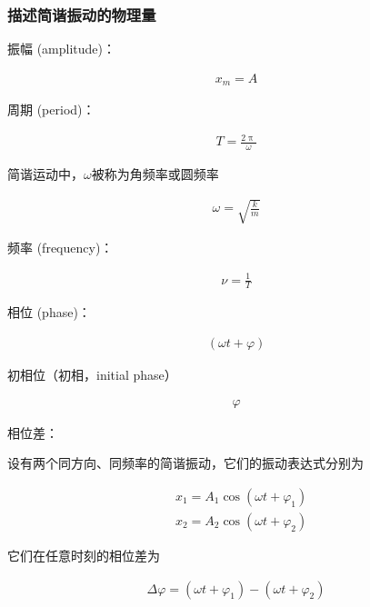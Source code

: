 \documentclass[12pt, a4paper]{article}
\numberwithin{equation}{section}
\begin{document}
\subsubsection{描述简谐振动的物理量}

    振幅 (amplitude)：

    \begin{align}
        x_m = A
    \end{align}

    周期 (period)：

    \begin{align}
        T = \frac{2 \uppi}{\omega}
    \end{align}

    简谐运动中，\(\omega\)被称为角频率或圆频率

    \begin{align}
        \omega = \sqrt{\frac{k}{m}}
    \end{align}

    频率 (frequency)：

    \begin{align}
        \nu = \frac{1}{T}
    \end{align}

    相位 (phase)：

    \begin{align}
        \left(\omega t + \varphi\right)
    \end{align}

    初相位（初相，initial phase）

    \begin{align}
        \varphi
    \end{align}

    相位差：

    设有两个同方向、同频率的简谐振动，它们的振动表达式分别为
    
    $$
        \begin{aligned}
            & x_1=A_1 \cos \left(\omega t+\varphi_1\right) \\
            & x_2=A_2 \cos \left(\omega t+\varphi_2\right)
        \end{aligned}
    $$

    它们在任意时刻的相位差为

    \begin{align}
        \Delta \varphi = \left(\omega t+\varphi_1\right) - \left(\omega t+\varphi_2\right)
    \end{align}
\end{document}
